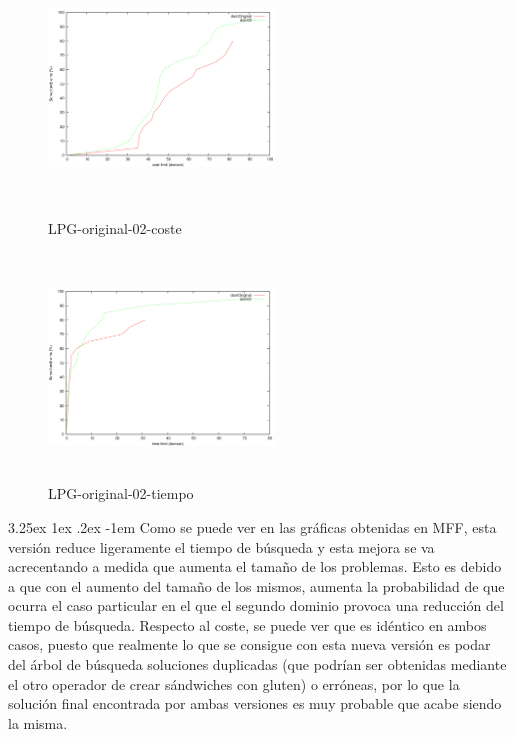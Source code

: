 \documentclass{article}
\makeatletter
\renewcommand\paragraph{\@startsection{paragraph}{5}{\z@}%
  {3.25ex \@plus1ex \@minus.2ex}%
  {-1em}%
  {\normalfont\normalsize\bfseries}}
\makeatother
\begin{document}
\begin{figure}[!htb]
   \begin{minipage}{0.48\textwidth}
     \centering
     \includegraphics[width=6cm, height=6cm]{lpg-or-02-cost}
    \caption{LPG-original-02-coste}
   \end{minipage}\hfill
   \begin {minipage}{0.48\textwidth}
     \centering
     \includegraphics[width=6cm, height=6cm]{lpg-or-02-time}
    \caption{LPG-original-02-tiempo}
   \end{minipage}
\end{figure}

\paragraph{}
Como se puede ver en las gráficas obtenidas en MFF, esta versión reduce ligeramente el tiempo de búsqueda y esta mejora se va acrecentando a medida que aumenta el tamaño de los problemas. Esto es debido a que con el aumento del tamaño de los mismos, aumenta la probabilidad de que ocurra el caso particular en el que el segundo dominio provoca una reducción del tiempo de búsqueda. Respecto al coste, se puede ver que es idéntico en ambos casos, puesto que realmente lo que se consigue con esta nueva versión es podar del árbol de búsqueda soluciones duplicadas (que podrían ser obtenidas mediante el otro operador de crear sándwiches con gluten) o erróneas, por lo que la solución final encontrada por ambas versiones es muy probable que acabe siendo la misma.
\end{document}
